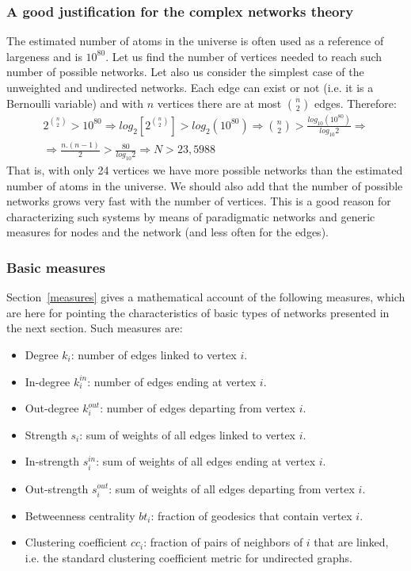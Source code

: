\subsubsection{A good justification for the complex networks theory}
The estimated number of atoms in the universe is often used as a reference of largeness
and is $10^80$.
Let us find the number of vertices needed to reach such number of possible networks.
Let also us consider the simplest case of the unweighted and undirected networks.
Each edge can exist or not (i.e. it is a Bernoulli variable) and with $n$ vertices there are
at most ${n \choose 2}$ edges.
Therefore:
\begin{align}
	2^{n \choose 2} > 10^{80} \Rightarrow 
	log_2[2^{n \choose 2}] > log_2(10^{80}) \Rightarrow
	{n \choose 2} > \frac{log_{10}(10^{80})}{log_{10}2} \Rightarrow \nonumber\\
	\Rightarrow \frac{n.(n-1)}{2} > \frac{80}{log_{10}2} \Rightarrow
		N > 23,5988 \;\;\;\;\;\;\;\;\;\;\;\;\;\;\;\;\;\;\;\;\;
			\nonumber
\end{align}
That is, with only 24 vertices we have more possible networks than
the estimated number of atoms in the universe.
We should also add that the number of possible networks grows
very fast with the number of vertices.
This is a good reason for characterizing such systems by means
of paradigmatic networks and generic measures for nodes and the network (and less often for the edges).

\subsubsection{Basic measures}
Section~\ref{measures} gives a mathematical account of the following measures,
which are here for pointing the characteristics of basic types
of networks presented in the next section.
Such measures are:
\begin{itemize}
	\item Degree     $k_i$: number of edges linked to vertex $i$.
	\item In-degree  $k_i^{in}$: number of edges ending at vertex $i$.
	\item Out-degree $k_i^{out}$: number of edges departing from vertex $i$.
	\item Strength $s_i$: sum of weights of all edges linked to vertex $i$.
	\item In-strength $s_i^{in}$: sum of weights of all edges ending at vertex $i$.
	\item Out-strength $s_i^{out}$: sum of weights of all edges departing from vertex $i$.
	\item Betweenness centrality $bt_i$: fraction of geodesics that contain vertex $i$.
	\item Clustering coefficient $cc_i$: fraction of pairs of neighbors of $i$ that are linked, i.e. the standard clustering coefficient metric for undirected graphs.
\end{itemize}

